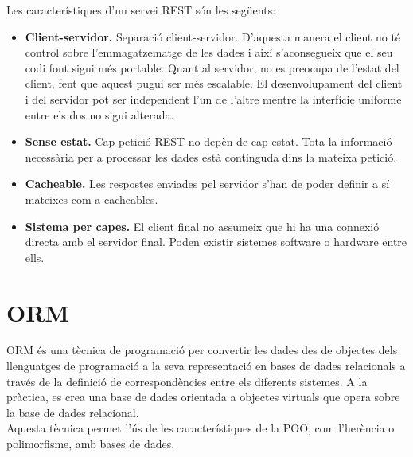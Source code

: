 Les característiques d'un servei \ac{REST} són les següents:
\begin{itemize}
	
	\item \textbf{Client-servidor.} Separació client-servidor. D'aquesta manera el client no té control sobre l'emmagatzematge de les dades i així s'aconsegueix que el seu codi font sigui més portable. Quant al servidor, no es preocupa de l'estat del client, fent que aquest pugui ser més escalable. El desenvolupament del client i del servidor pot ser independent l'un de l'altre mentre la interfície uniforme entre els dos no sigui alterada.
	
	\item \textbf{Sense estat.} Cap petició \ac{REST} no depèn de cap estat. Tota la informació necessària per a processar les dades està continguda dins la mateixa petició.
	
	\item \textbf{Cacheable.} Les respostes enviades pel servidor s'han de poder definir a sí mateixes com a cacheables.
	
	\item \textbf{Sistema per capes.} El client final no assumeix que hi ha una connexió directa amb el servidor final. Poden existir sistemes software o hardware entre ells.
	
\end{itemize}

\section{\ac{ORM}}
\ac{ORM} és una tècnica de programació per convertir les dades des de objectes dels llenguatges de programació a la seva representació en bases de dades relacionals a través de la definició de correspondències entre els diferents sistemes. A la pràctica, es crea una base de dades orientada a objectes virtuals que opera sobre la base de dades relacional.\\

Aquesta tècnica permet l'ús de les característiques de la \ac{POO}, com l'herència o polimorfisme,  amb bases de dades.
